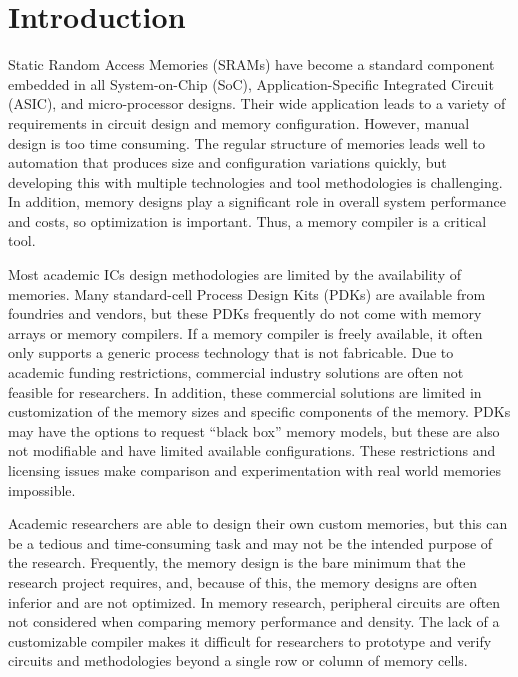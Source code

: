\section{Introduction}
\label{sec:introduction}

Static Random Access Memories (SRAMs) have become a standard component
embedded in all System-on-Chip (SoC), Application-Specific Integrated
Circuit (ASIC), and micro-processor designs. Their wide application
leads to a variety of requirements in circuit design and memory
configuration. However, manual design is 
too time consuming. The
regular structure of memories leads well to automation that produces
size and configuration variations quickly, but developing this with
multiple technologies and tool methodologies is challenging. In
addition, memory designs play a significant role in overall system
performance and costs, so optimization is important. Thus, a memory
compiler is a critical tool.

Most academic ICs design methodologies are limited by the availability
of memories. Many standard-cell Process Design Kits (PDKs) are
available from foundries and vendors, but these PDKs frequently do not
come with memory arrays or memory compilers. If a memory compiler is
freely available, it often only supports a generic process technology
that is not fabricable.  Due to academic funding restrictions,
commercial industry solutions are often not feasible for
researchers. In addition, these commercial solutions are limited in
customization of the memory sizes and specific components of the
memory. PDKs may have the options to request \enquote{black box}
memory models, but these are also not modifiable and have limited
available configurations. These restrictions and licensing issues make
comparison and experimentation with real world memories impossible.

Academic researchers are able to design their own custom memories, but
this can be a tedious and time-consuming task and may not be the intended
purpose of the research. Frequently, the memory design is the bare
minimum that the research project requires,
and, because of this, the memory designs are often inferior and are not
optimized. In memory research, peripheral circuits are often not
considered when comparing memory performance and density. The
lack of a customizable compiler makes it difficult for researchers to
prototype and verify circuits and methodologies beyond a single row or
column of memory cells.

